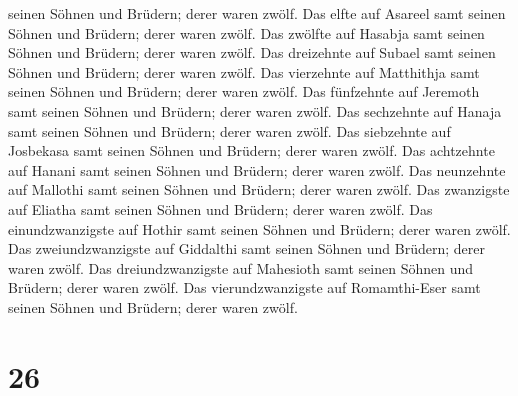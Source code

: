 seinen Söhnen und Brüdern; derer waren zwölf.  Das elfte
auf Asareel samt seinen Söhnen und Brüdern; derer waren zwölf.
 Das zwölfte auf Hasabja samt seinen Söhnen und Brüdern;
derer waren zwölf.  Das dreizehnte auf Subael samt seinen
Söhnen und Brüdern; derer waren zwölf.  Das vierzehnte auf
Matthithja samt seinen Söhnen und Brüdern; derer waren zwölf.
 Das fünfzehnte auf Jeremoth samt seinen Söhnen und
Brüdern; derer waren zwölf.  Das sechzehnte auf Hanaja samt
seinen Söhnen und Brüdern; derer waren zwölf.  Das
siebzehnte auf Josbekasa samt seinen Söhnen und Brüdern; derer waren
zwölf.  Das achtzehnte auf Hanani samt seinen Söhnen und
Brüdern; derer waren zwölf.  Das neunzehnte auf Mallothi
samt seinen Söhnen und Brüdern; derer waren zwölf.  Das
zwanzigste auf Eliatha samt seinen Söhnen und Brüdern; derer waren
zwölf.  Das einundzwanzigste auf Hothir samt seinen Söhnen
und Brüdern; derer waren zwölf.  Das zweiundzwanzigste auf
Giddalthi samt seinen Söhnen und Brüdern; derer waren zwölf.
 Das dreiundzwanzigste auf Mahesioth samt seinen Söhnen und
Brüdern; derer waren zwölf.  Das vierundzwanzigste auf
Romamthi-Eser samt seinen Söhnen und Brüdern; derer waren zwölf.

\hypertarget{section-25}{%
\section{26}\label{section-25}}

